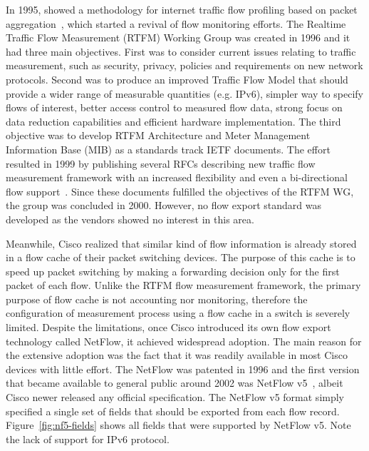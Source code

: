 In 1995, \citeauthor{Claffy-1995-Parameterizable} showed a methodology for internet traffic flow profiling based on packet aggregation~\cite{Claffy-1995-Parameterizable}, which started a revival of flow monitoring efforts. The Realtime Traffic Flow  Measurement (RTFM) Working Group was created in 1996 and it had three main objectives. First was to consider current issues relating to traffic measurement, such as security, privacy, policies and requirements on new network protocols. Second was to produce an improved Traffic Flow Model that should provide a wider range of measurable quantities (e.g. IPv6), simpler way to specify flows of interest, better access control  to measured flow data, strong focus on data reduction capabilities and efficient hardware implementation. The third objective was to develop RTFM Architecture and Meter Management Information Base (MIB) as a standards track IETF documents. The effort resulted in 1999 by publishing several RFCs describing new traffic flow measurement framework with an increased flexibility and even a bi-directional flow support~\cite{rfc2722}. Since these documents fulfilled the objectives of the RTFM WG, the group was concluded in 2000. However, no flow export standard was developed as the vendors showed no interest in this area.

Meanwhile, Cisco realized that similar kind of flow information is already stored in a flow cache of their packet switching devices. The purpose of this cache is to speed up packet switching by making a forwarding decision only for the first packet of each flow. Unlike the RTFM flow measurement framework, the primary purpose of flow cache is not accounting nor monitoring, therefore the configuration of measurement process using a flow cache in a switch is severely limited. Despite the limitations, once Cisco introduced its own flow export technology called NetFlow, it achieved widespread adoption. The main reason for the extensive adoption was the fact that it was readily available in most Cisco devices with little effort. The NetFlow was patented in 1996 and the first version that became available to general public around 2002 was NetFlow v5~\cite{CiscoSystems-2007-NetFlow}, albeit Cisco newer released any official specification. The NetFlow v5 format simply specified a single set of fields that should be exported from each flow record. Figure~\ref{fig:nf5-fields} shows all fields that were supported by NetFlow v5. Note the lack of support for IPv6 protocol.

